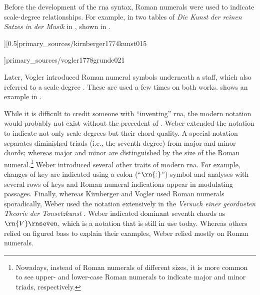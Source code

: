 



Before the development of the \gls{rna} syntax, Roman
numerals were used to indicate scale-degree relationships.
For example, in two tables of \emph{Die Kunst der reinen
Satzes in der Musik} in \textcite{kirnberger1774kunst},
shown in .

\phdfigure[Roman numerals in \textcite[page
15]{kirnberger1774kunst}][0.5]{primary_sources/kirnberger1774kunst015}
 
\phdfigure[Roman numerals in \textcite[page
21]{vogler1778grunde}]{primary_sources/vogler1778grunde021}

Later, Vogler introduced Roman numeral symbols underneath a
staff, which also referred to a scale degree
\parencite{vogler1778grunde, vogler1802handbuch}. These are
used a few times on both works.
 shows an
example in \textcite{vogler1778grunde}.


While it is difficult to credit someone with ``inventing''
\gls{rna}, the modern notation would probably not exist
without the precedent of \textcite{weber1817versuch}. Weber
extended the notation to indicate not only scale degrees but
their chord quality. A special notation separates diminished
triads (i.e., the seventh degree) from major and minor
chords; whereas major and minor are distinguished by the
size of the Roman numeral.\footnote{Nowadays, instead of
Roman numerals of different sizes, it is more common to see
upper- and lower-case Roman numerals to indicate major and
minor triads, respectively.} Weber introduced several other
traits of modern \gls{rna}. For example, changes of key are
indicated using a colon (``$\rn{:}$'') symbol and analyses
with several rows of keys and Roman numeral indications
appear in modulating passages. Finally, whereas Kirnberger
and Vogler used Roman numerals sporadically, Weber used the
notation extensively in the
\emph{Versuch einer geordneten Theorie der Tonsetzkunst}
\parencite{weber1817versuch}. Weber indicated dominant
seventh chords as $\rn{V}\rnseven$, which is a notation that
is still in use today. Whereas others relied on figured bass
to explain their examples, Weber relied mostly on Roman
numerals.
